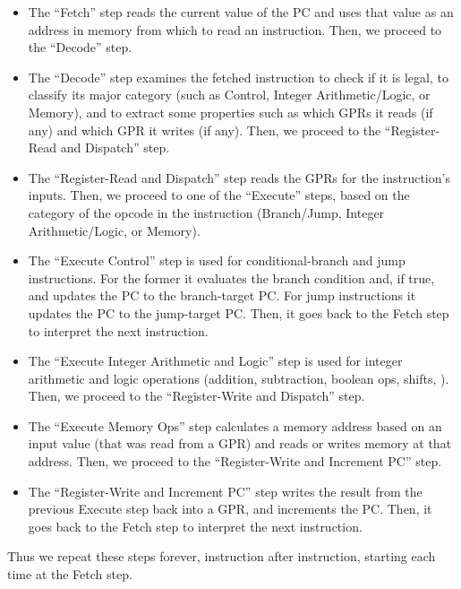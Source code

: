 \begin{itemize}

\item The ``Fetch'' step reads the current value of the PC and uses
  that value as an address in memory from which to read an
  instruction.  Then, we proceed to the ``Decode'' step.

\item The ``Decode'' step examines the fetched instruction to check if
  it is legal, to classify its major category (such as Control,
  Integer Arithmetic/Logic, or Memory), and to extract some properties
  such as which GPRs it reads (if any) and which GPR it writes (if
  any).  Then, we proceed to the ``Register-Read and Dispatch'' step.

\item The ``Register-Read and Dispatch'' step reads the GPRs for the
instruction's inputs.  Then, we proceed to one of the ``Execute''
steps, based on the category of the opcode in the instruction
(Branch/Jump, Integer Arithmetic/Logic, or Memory).

\item The ``Execute Control'' step is used for conditional-branch and
jump instructions.  For the former it evaluates the branch condition
and, if true, and updates the PC to the branch-target PC.  For jump
instructions it updates the PC to the jump-target PC. Then, it goes
back to the Fetch step to interpret the next instruction.

\item The ``Execute Integer Arithmetic and Logic'' step is used for
integer arithmetic and logic operations (addition, subtraction,
boolean ops, shifts, {\etc}).  Then, we proceed to the
``Register-Write and Dispatch'' step.

\item The ``Execute Memory Ops'' step calculates a memory address
based on an input value (that was read from a GPR) and reads or writes
memory at that address.  Then, we proceed to the ``Register-Write and
Increment PC'' step.

\item The ``Register-Write and Increment PC'' step writes the result
from the previous Execute step back into a GPR, and increments the PC.
Then, it goes back to the Fetch step to interpret the next
instruction.

\end{itemize}

Thus we repeat these steps forever, instruction after instruction,
starting each time at the Fetch step.

